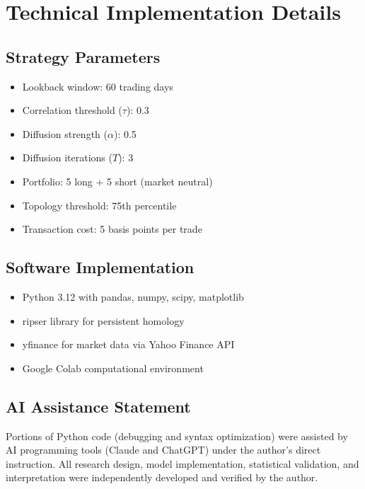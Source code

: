 \documentclass[12pt,letterpaper]{article}
\begin{document}




\appendix

\section{Technical Implementation Details}
\label{app:technical}

\subsection{Strategy Parameters}
\begin{itemize}
    \item Lookback window: 60 trading days
    \item Correlation threshold ($\tau$): 0.3
    \item Diffusion strength ($\alpha$): 0.5
    \item Diffusion iterations ($T$): 3
    \item Portfolio: 5 long + 5 short (market neutral)
    \item Topology threshold: 75th percentile
    \item Transaction cost: 5 basis points per trade
\end{itemize}

\subsection{Software Implementation}
\begin{itemize}
    \item Python 3.12 with pandas, numpy, scipy, matplotlib
    \item ripser library for persistent homology
    \item yfinance for market data via Yahoo Finance API
    \item Google Colab computational environment
\end{itemize}

\subsection{AI Assistance Statement}

Portions of Python code (debugging and syntax optimization) were assisted by AI programming tools (Claude and ChatGPT) under the author's direct instruction. All research design, model implementation, statistical validation, and interpretation were independently developed and verified by the author.
\end{document}
